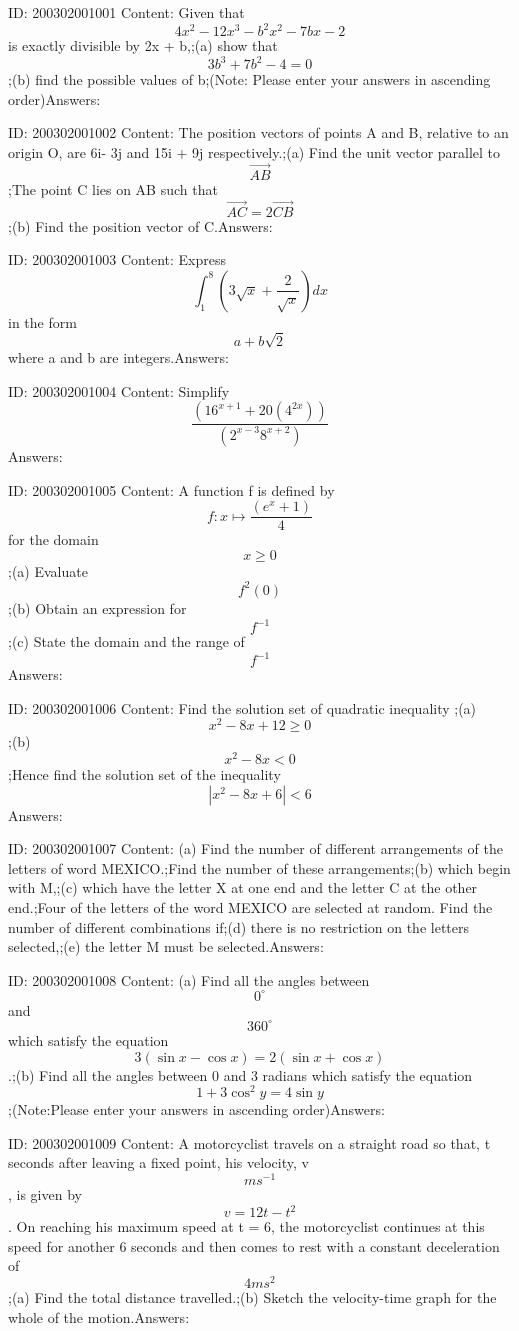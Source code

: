 \documentclass{article}
\begin{document}
ID: 200302001001
Content:
Given that $$4x^2-12x^3-b^2x^2-7bx-2$$ is exactly divisible by 2x + b,;(a)	show that $$3b^3+7b^2-4=0$$;(b)	find the possible values of b;(Note: Please enter your answers in ascending order)Answers:

ID: 200302001002
Content:
The position vectors of points A and B, relative to an origin O, are 6i- 3j and 15i + 9j respectively.;(a)	Find the unit vector parallel to $$\vec{AB}$$;The point C lies on AB such that $$\vec{AC}=2\vec{CB}$$;(b)	Find the position vector of C.Answers:

ID: 200302001003
Content:
Express $$\int_1^8(3\sqrt {x}+\frac{2}{\sqrt{x}})dx$$ in the form $$a+b\sqrt2$$ where a and b are integers.Answers:

ID: 200302001004
Content:
Simplify $$\frac{ (16^{x+1}+20(4^{2x}))}{(2^{x-3}8^{x+2})}$$Answers:

ID: 200302001005
Content:
A function f is defined by $$f:x \mapsto\frac{(e^x+1)}{4}$$ for the domain $$x\geq0$$;(a)	Evaluate $$f^2(0)$$;(b)	Obtain an expression for $$f^{-1}$$;(c)	State the domain and the range of $$f^{-1}$$Answers:

ID: 200302001006
Content:
Find the solution set of quadratic inequality ;(a) $$x^2-8x+12\geq0$$;(b) $$x^2-8x<0$$;Hence find the solution set of the inequality $$|x^2-8x+6|<6$$Answers:

ID: 200302001007
Content:
(a)	Find the number of different arrangements of the letters of word MEXICO.;Find the number of these arrangements;(b)	which begin with M,;(c)	which have the letter X at one end and the letter C at the other end.;Four of the letters of the word MEXICO are selected at random. Find the number of different combinations if;(d)	there is no restriction on the letters selected,;(e)	the letter M must be selected.Answers:

ID: 200302001008
Content:
(a)	Find all the angles between $$0^{\circ}$$ and $$360^{\circ}$$ which satisfy the equation $$3(\sin  x-\cos  x) = 2(\sin  x + \cos  x)$$.;(b)	Find all the angles between 0 and 3 radians which satisfy the equation $$1+3\cos ^2y=4\sin y$$;(Note:Please enter your answers in ascending order)Answers:

ID: 200302001009
Content:
A motorcyclist travels on a straight road so that, t seconds after leaving a fixed point, his velocity, v $$ms^{-1}$$, is given by $$v=12t-t^2$$. On reaching his maximum speed at t = 6, the motorcyclist continues at this speed for another 6 seconds and then comes to rest with a constant deceleration of $$4ms^2$$;(a)	Find the total distance travelled.;(b)	Sketch the velocity-time graph for the whole of the motion.Answers:
\end{document}
